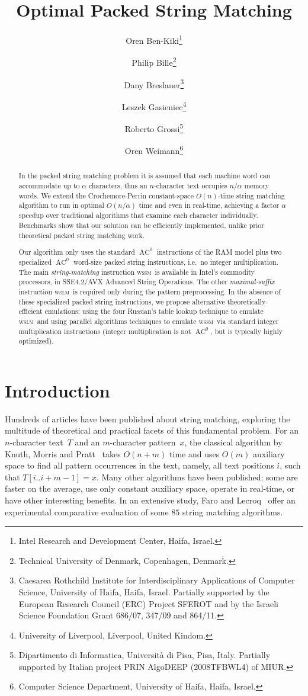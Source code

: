\documentclass[12pt]{article}
\title{Optimal Packed String Matching}
\author{Oren Ben-Kiki\thanks{Intel Research and Development Center, Haifa, Israel.} \and
Philip Bille\thanks{Technical University of Denmark, Copenhagen, Denmark.}  \and
Dany Breslauer\thanks{
Caesarea Rothchild Institute
for Interdisciplinary Applications of Computer Science, 
University of Haifa, Haifa, Israel. Partially supported by 
the European Research Council (ERC) Project SFEROT and by
the Israeli Science Foundation Grant 
686/07, 347/09 and 864/11.} \and
Leszek Gasieniec\thanks{University of Liverpool, Liverpool, United Kindom.}  \and
Roberto Grossi\thanks{Dipartimento di Informatica, Universit\`a di Pisa, Pisa, Italy. 
Partially supported by Italian project PRIN AlgoDEEP (2008TFBWL4) of MIUR.}  \and
Oren Weimann\thanks{Computer Science Department, University of Haifa, Haifa, Israel.} }
\newcommand{\C}{{\alpha}}
\newcommand{\wssm}{\textsc{wssm}}
\newcommand{\wslm}{\textsc{wslm}}
\begin{document}
\maketitle

\begin{abstract}
  In the packed string matching problem it is assumed that 
  each machine word can accommodate up to $\C$ characters, thus
  an $n$-character text occupies $ n/ \C $ memory words.
  We extend the Crochemore-Perrin constant-space
  $O(n)$-time string matching algorithm to run in optimal $O(n/\C)$ time 
  and even in real-time, achieving a factor $\C$ speedup over traditional
  algorithms that examine each character individually.
  Benchmarks show that our solution can be efficiently implemented,
  unlike prior theoretical packed string matching work.

  Our algorithm only uses the standard $\mathop{AC}^0$ instructions
   of the RAM model 
  plus two specialized $\mathop{AC}^0$ word-size packed string instructions,
  i.e.~no integer multiplication.
  The main {\em string-matching} instruction \wssm\ 
  is available in Intel's commodity processors, in SSE4.2/AVX Advanced String Operations.
  The other {\em maximal-suffix} instruction \wslm\ is  required 
  only during the pattern preprocessing.
  In the absence of these specialized packed string instructions,
  we propose alternative theoretically-efficient emulations:
  using the four Russian's table lookup technique to emulate \wslm\ and 
  using parallel algorithms techniques to emulate \wssm\ via
  standard integer multiplication instructions
  (integer multiplication is not $\mathop{AC}^0$, but is typically highly optimized).
  
\end{abstract}

\section{Introduction}
\label{sec:introduction}
Hundreds of articles have been published about string matching,
exploring the multitude of theoretical and practical facets of this
fundamental problem.
For an $n$-character text~$T$ and an $m$-character pattern~$x$,
the classical algorithm by Knuth, Morris and Pratt~\cite{kmp:77} 
takes $O(n+m)$ time and uses $O(m)$ auxiliary space to
find all pattern occurrences in the text, namely,
all text positions $i$, such that $T[i..i+m-1]=x$.
Many other algorithms have been published; some are faster
on the average, use only constant auxiliary space, operate in
real-time, or have other interesting benefits.
In an extensive study, Faro and Lecroq~\cite{FL2011}
offer an experimental comparative evaluation of some $85$
string matching algorithms.
\end{document}
